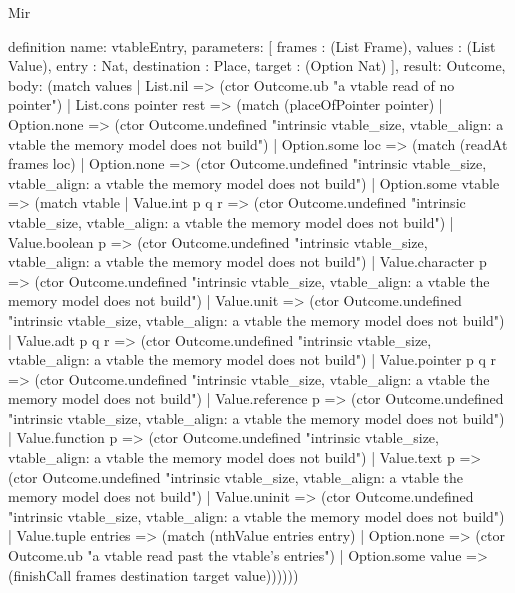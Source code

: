 \begin{lexlean}{Mir}
\begin{semanticmodule}
definition{
  name: vtableEntry,
  parameters: [
    frames : (List Frame),
    values : (List Value),
    entry : Nat,
    destination : Place,
    target : (Option Nat)
  ],
  result: Outcome,
  body: (match values
    | List.nil => (ctor Outcome.ub "a vtable read of no pointer")
    | List.cons pointer rest => (match (placeOfPointer pointer)
      | Option.none => (ctor Outcome.undefined "intrinsic vtable_size, vtable_align: a vtable the memory model does not build")
      | Option.some loc => (match (readAt frames loc)
        | Option.none => (ctor Outcome.undefined "intrinsic vtable_size, vtable_align: a vtable the memory model does not build")
        | Option.some vtable => (match vtable
          | Value.int p q r => (ctor Outcome.undefined "intrinsic vtable_size, vtable_align: a vtable the memory model does not build")
          | Value.boolean p => (ctor Outcome.undefined "intrinsic vtable_size, vtable_align: a vtable the memory model does not build")
          | Value.character p => (ctor Outcome.undefined "intrinsic vtable_size, vtable_align: a vtable the memory model does not build")
          | Value.unit => (ctor Outcome.undefined "intrinsic vtable_size, vtable_align: a vtable the memory model does not build")
          | Value.adt p q r => (ctor Outcome.undefined "intrinsic vtable_size, vtable_align: a vtable the memory model does not build")
          | Value.pointer p q r => (ctor Outcome.undefined "intrinsic vtable_size, vtable_align: a vtable the memory model does not build")
          | Value.reference p => (ctor Outcome.undefined "intrinsic vtable_size, vtable_align: a vtable the memory model does not build")
          | Value.function p => (ctor Outcome.undefined "intrinsic vtable_size, vtable_align: a vtable the memory model does not build")
          | Value.text p => (ctor Outcome.undefined "intrinsic vtable_size, vtable_align: a vtable the memory model does not build")
          | Value.uninit => (ctor Outcome.undefined "intrinsic vtable_size, vtable_align: a vtable the memory model does not build")
          | Value.tuple entries => (match (nthValue entries entry)
            | Option.none => (ctor Outcome.ub "a vtable read past the vtable's entries")
            | Option.some value => (finishCall frames destination target value))))))
}


\end{semanticmodule}
\end{lexlean}

